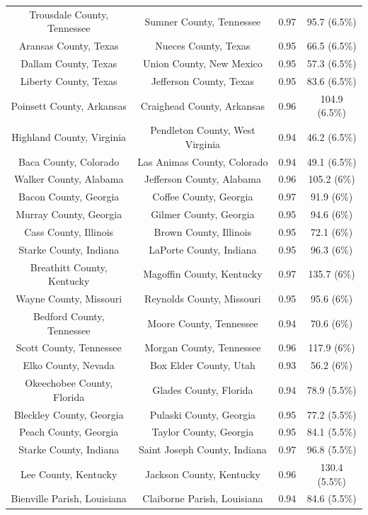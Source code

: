 \begin{longtable}{cccc}
  Trousdale County, Tennessee & Sumner County, Tennessee & 0.97 & 95.7 (6.5\%) \\ 
  Aransas County, Texas & Nueces County, Texas & 0.95 & 66.5 (6.5\%) \\ 
  Dallam County, Texas & Union County, New Mexico & 0.95 & 57.3 (6.5\%) \\ 
  Liberty County, Texas & Jefferson County, Texas & 0.95 & 83.6 (6.5\%) \\ 
  Poinsett County, Arkansas & Craighead County, Arkansas & 0.96 & 104.9 (6.5\%) \\ 
  Highland County, Virginia & Pendleton County, West Virginia & 0.94 & 46.2 (6.5\%) \\ 
  Baca County, Colorado & Las Animas County, Colorado & 0.94 & 49.1 (6.5\%) \\ 
  Walker County, Alabama & Jefferson County, Alabama & 0.96 & 105.2 (6\%) \\ 
  Bacon County, Georgia & Coffee County, Georgia & 0.97 & 91.9 (6\%) \\ 
  Murray County, Georgia & Gilmer County, Georgia & 0.95 & 94.6 (6\%) \\ 
  Cass County, Illinois & Brown County, Illinois & 0.95 & 72.1 (6\%) \\ 
  Starke County, Indiana & LaPorte County, Indiana & 0.95 & 96.3 (6\%) \\ 
  Breathitt County, Kentucky & Magoffin County, Kentucky & 0.97 & 135.7 (6\%) \\ 
  Wayne County, Missouri & Reynolds County, Missouri & 0.95 & 95.6 (6\%) \\ 
  Bedford County, Tennessee & Moore County, Tennessee & 0.94 & 70.6 (6\%) \\ 
  Scott County, Tennessee & Morgan County, Tennessee & 0.96 & 117.9 (6\%) \\ 
  Elko County, Nevada & Box Elder County, Utah & 0.93 & 56.2 (6\%) \\ 
  Okeechobee County, Florida & Glades County, Florida & 0.94 & 78.9 (5.5\%) \\ 
  Bleckley County, Georgia & Pulaski County, Georgia & 0.95 & 77.2 (5.5\%) \\ 
  Peach County, Georgia & Taylor County, Georgia & 0.95 & 84.1 (5.5\%) \\ 
  Starke County, Indiana & Saint Joseph County, Indiana & 0.97 & 96.8 (5.5\%) \\ 
  Lee County, Kentucky & Jackson County, Kentucky & 0.96 & 130.4 (5.5\%) \\ 
  Bienville Parish, Louisiana & Claiborne Parish, Louisiana & 0.94 & 84.6 (5.5\%) \\ 

\end{longtable}
